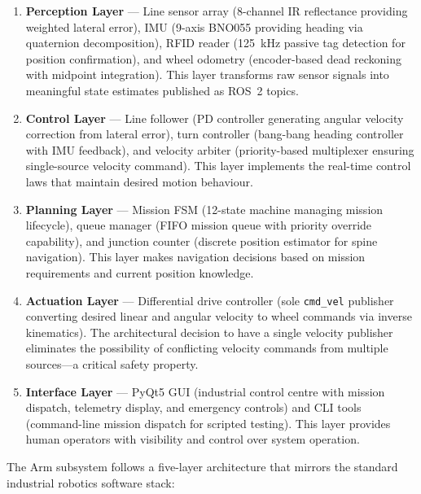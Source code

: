 \documentclass[12pt,a4paper,oneside]{report}
\begin{document}
\begin{enumerate}
\item \textbf{Perception Layer} --- Line sensor array (8-channel IR reflectance providing weighted lateral error), IMU (9-axis BNO055 providing heading via quaternion decomposition), RFID reader (125~kHz passive tag detection for position confirmation), and wheel odometry (encoder-based dead reckoning with midpoint integration). This layer transforms raw sensor signals into meaningful state estimates published as ROS~2 topics.

\item \textbf{Control Layer} --- Line follower (PD controller generating angular velocity correction from lateral error), turn controller (bang-bang heading controller with IMU feedback), and velocity arbiter (priority-based multiplexer ensuring single-source velocity command). This layer implements the real-time control laws that maintain desired motion behaviour.

\item \textbf{Planning Layer} --- Mission FSM (12-state machine managing mission lifecycle), queue manager (FIFO mission queue with priority override capability), and junction counter (discrete position estimator for spine navigation). This layer makes navigation decisions based on mission requirements and current position knowledge.

\item \textbf{Actuation Layer} --- Differential drive controller (sole \texttt{cmd\_vel} publisher converting desired linear and angular velocity to wheel commands via inverse kinematics). The architectural decision to have a single velocity publisher eliminates the possibility of conflicting velocity commands from multiple sources---a critical safety property.

\item \textbf{Interface Layer} --- PyQt5 GUI (industrial control centre with mission dispatch, telemetry display, and emergency controls) and CLI tools (command-line mission dispatch for scripted testing). This layer provides human operators with visibility and control over system operation.
\end{enumerate}

The Arm subsystem follows a five-layer architecture that mirrors the standard industrial robotics software stack:
\end{document}
